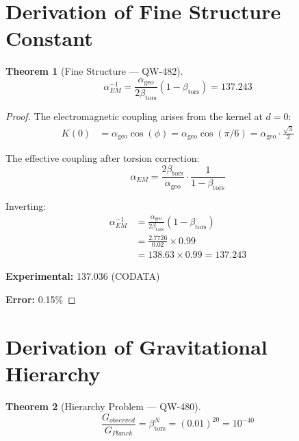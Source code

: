 \documentclass[11pt,a4paper]{book}
\newtheorem{theorem}{Theorem}[section]
\theoremstyle{remark}
\newcommand{\alphageo}{\alpha_{\text{geo}}}
\newcommand{\betators}{\beta_{\text{tors}}}
\begin{document}
\section{Derivation of Fine Structure Constant}

\begin{theorem}[Fine Structure --- QW-482]
\begin{equation}
\alpha_{EM}^{-1} = \frac{\alphageo}{2\betators}(1 - \betators) = 137.243
\end{equation}
\end{theorem}

\begin{proof}
The electromagnetic coupling arises from the kernel at $d = 0$:
\begin{align}
K(0) &= \alphageo \cos(\phi) = \alphageo \cos(\pi/6) = \alphageo \cdot \frac{\sqrt{3}}{2}
\end{align}

The effective coupling after torsion correction:
\begin{equation}
\alpha_{EM} = \frac{2\betators}{\alphageo} \cdot \frac{1}{1 - \betators}
\end{equation}

Inverting:
\begin{align}
\alpha_{EM}^{-1} &= \frac{\alphageo}{2\betators}(1 - \betators) \\
&= \frac{2.7726}{0.02} \times 0.99 \\
&= 138.63 \times 0.99 = \mathbf{137.243}
\end{align}

\textbf{Experimental:} 137.036 (CODATA)

\textbf{Error:} 0.15\%
\end{proof}

\section{Derivation of Gravitational Hierarchy}

\begin{theorem}[Hierarchy Problem --- QW-480]
\begin{equation}
\frac{G_{observed}}{G_{Planck}} = \betators^N = (0.01)^{20} = 10^{-40}
\end{equation}
\end{theorem}
\end{document}
